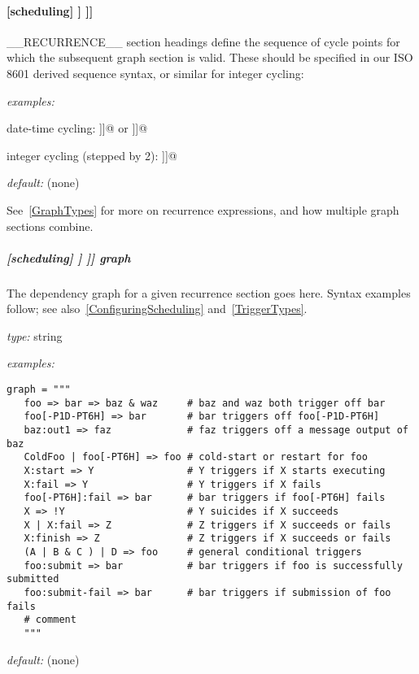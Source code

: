 \paragraph[{[[[}\_\_RECURRENCE\_\_{]]]}]{[scheduling] \textrightarrow [[dependencies]] \textrightarrow [[[\_\_RECURRENCE\_\_]]]}

\_\_RECURRENCE\_\_ section headings define the sequence of cycle points for
which the subsequent graph section is valid. These should be specified in
our ISO 8601 derived sequence syntax, or similar for integer cycling:
\begin{myitemize}
    \item {\em examples:}
        \begin{myitemize}
            \item date-time cycling:
                \lstinline@[[[T00,T06,T12,T18]]]@ or \lstinline@[[[PT6H]]]@
            \item integer cycling (stepped by 2):
                \lstinline@[[[P2]]]@
        \end{myitemize}
    \item {\em default:} (none)
\end{myitemize}

See~\ref{GraphTypes} for more on recurrence expressions, and how multiple graph
sections combine.

\subparagraph[graph]{[scheduling] \textrightarrow [[dependencies]] \textrightarrow [[[\_\_RECURRENCE\_\_]]] \textrightarrow graph }
\label{GraphDescrip}

The dependency graph for a given recurrence section goes here. Syntax examples
follow; see also~\ref{ConfiguringScheduling} and~\ref{TriggerTypes}.

\begin{myitemize}
\item {\em type:} string
\item {\em examples:}
  \begin{lstlisting}
graph = """
   foo => bar => baz & waz     # baz and waz both trigger off bar
   foo[-P1D-PT6H] => bar       # bar triggers off foo[-P1D-PT6H]
   baz:out1 => faz             # faz triggers off a message output of baz
   ColdFoo | foo[-PT6H] => foo # cold-start or restart for foo
   X:start => Y                # Y triggers if X starts executing
   X:fail => Y                 # Y triggers if X fails
   foo[-PT6H]:fail => bar      # bar triggers if foo[-PT6H] fails
   X => !Y                     # Y suicides if X succeeds
   X | X:fail => Z             # Z triggers if X succeeds or fails
   X:finish => Z               # Z triggers if X succeeds or fails
   (A | B & C ) | D => foo     # general conditional triggers
   foo:submit => bar           # bar triggers if foo is successfully submitted
   foo:submit-fail => bar      # bar triggers if submission of foo fails
   # comment
   """
  \end{lstlisting}
\item {\em default:} (none)
\end{myitemize}

